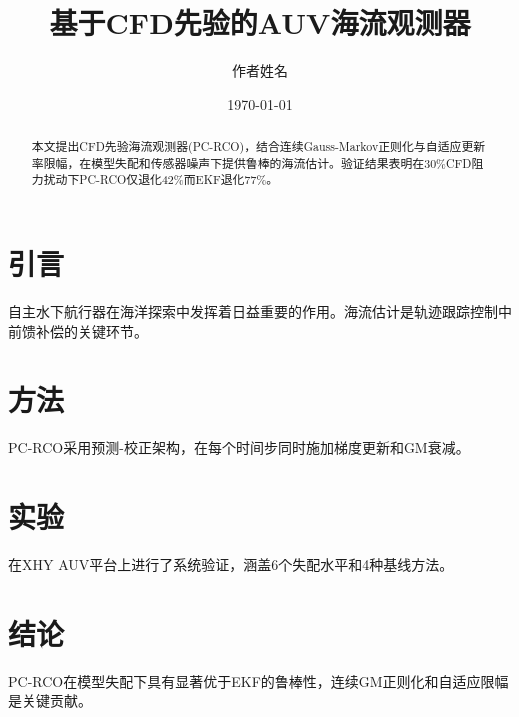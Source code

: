 \documentclass[12pt,a4paper]{ctexart}
\title{基于CFD先验的AUV海流观测器}
\author{作者姓名}
\date{\today}
\begin{document}
\maketitle

\begin{abstract}
本文提出CFD先验海流观测器(PC-RCO)，结合连续Gauss-Markov正则化与自适应更新率限幅，在模型失配和传感器噪声下提供鲁棒的海流估计。验证结果表明在30\%CFD阻力扰动下PC-RCO仅退化42\%而EKF退化77\%。
\end{abstract}

\section{引言}
自主水下航行器在海洋探索中发挥着日益重要的作用。海流估计是轨迹跟踪控制中前馈补偿的关键环节。

\section{方法}
PC-RCO采用预测-校正架构，在每个时间步同时施加梯度更新和GM衰减。

\section{实验}
在XHY AUV平台上进行了系统验证，涵盖6个失配水平和4种基线方法。

\section{结论}
PC-RCO在模型失配下具有显著优于EKF的鲁棒性，连续GM正则化和自适应限幅是关键贡献。
\end{document}

